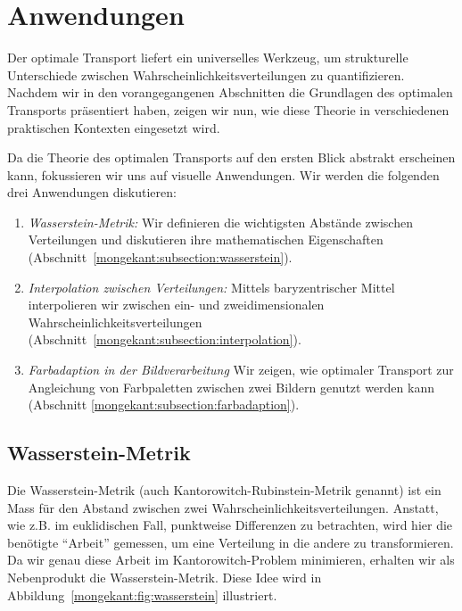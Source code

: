 %
%
%
%
\section{Anwendungen%
\label{mongekant:section:teil3}}

Der optimale Transport liefert ein universelles Werkzeug,
um strukturelle Unterschiede zwischen Wahrscheinlichkeitsverteilungen zu quantifizieren.
Nachdem wir in den vorangegangenen Abschnitten
die Grundlagen des optimalen Transports präsentiert haben,
zeigen wir nun,
wie diese Theorie in verschiedenen praktischen Kontexten eingesetzt wird.

Da die Theorie des optimalen Transports auf den ersten Blick abstrakt erscheinen kann,
fokussieren wir uns auf visuelle Anwendungen.
Wir werden die folgenden drei Anwendungen diskutieren:
\begin{enumerate}
\item \emph{Wasserstein-Metrik:}
%
Wir definieren die wichtigsten Abstände zwischen Verteilungen und
diskutieren ihre mathematischen Eigenschaften
(Abschnitt~\ref{mongekant:subsection:wasserstein}).
\item \emph{Interpolation zwischen Verteilungen:}
%
Mittels baryzentrischer Mittel interpolieren
%
wir zwischen ein- und zweidimensionalen Wahrscheinlichkeitsverteilungen
(Abschnitt~\ref{mongekant:subsection:interpolation}).
\item \emph{Farbadaption in der Bildverarbeitung}
%
Wir zeigen,
wie optimaler Transport zur Angleichung von Farbpaletten
%
zwischen zwei Bildern genutzt werden kann
(Abschnitt \ref{mongekant:subsection:farbadaption}).
\end{enumerate}

\subsection{Wasserstein-Metrik%
\label{mongekant:subsection:wasserstein}}

Die Wasserstein-Metrik (auch Kantorowitch-Rubinstein-Metrik genannt)
%
ist ein Mass für den Abstand zwischen zwei Wahrscheinlichkeitsverteilungen.
%
Anstatt,
wie z.B. im euklidischen Fall,
punktweise Differenzen zu betrachten,
wird hier die benötigte ``Arbeit'' gemessen,
um eine Verteilung in die andere zu transformieren.
Da wir genau diese Arbeit im Kantorowitch-Problem minimieren,
erhalten wir als Nebenprodukt die Wasserstein-Metrik.
Diese Idee wird in Abbildung~\ref{mongekant:fig:wasserstein} illustriert.

